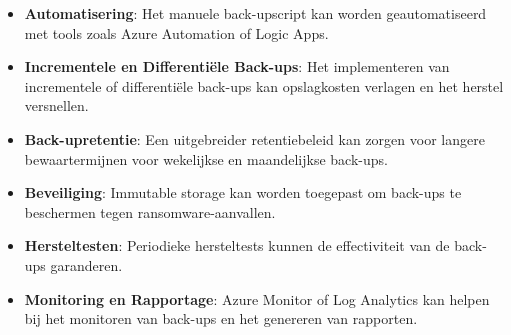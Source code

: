 \begin{itemize}
    \item \textbf{Automatisering}: Het manuele back-upscript kan worden geautomatiseerd met tools zoals Azure Automation of Logic Apps.
    \item \textbf{Incrementele en Differentiële Back-ups}: Het implementeren van incrementele of differentiële back-ups kan opslagkosten verlagen en het herstel versnellen.
    \item \textbf{Back-upretentie}: Een uitgebreider retentiebeleid kan zorgen voor langere bewaartermijnen voor wekelijkse en maandelijkse back-ups.
    \item \textbf{Beveiliging}: Immutable storage kan worden toegepast om back-ups te beschermen tegen ransomware-aanvallen.
    \item \textbf{Hersteltesten}: Periodieke hersteltests kunnen de effectiviteit van de back-ups garanderen.
    \item \textbf{Monitoring en Rapportage}: Azure Monitor of Log Analytics kan helpen bij het monitoren van back-ups en het genereren van rapporten.
\end{itemize}